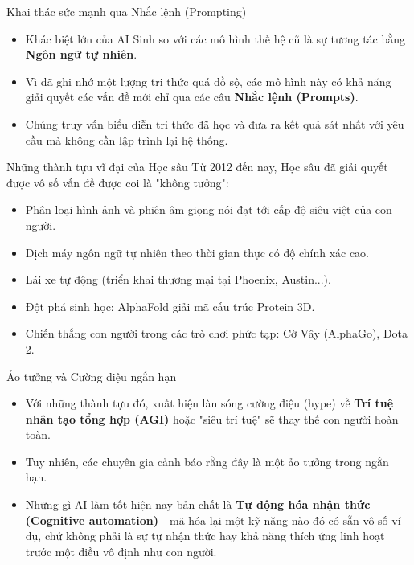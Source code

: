 \documentclass[aspectratio=169]{beamer}
\begin{document}
\begin{frame}{Khai thác sức mạnh qua Nhắc lệnh (Prompting)}
    \begin{itemize}
        \item Khác biệt lớn của AI Sinh so với các mô hình thế hệ cũ là sự tương tác bằng \textbf{Ngôn ngữ tự nhiên}.
        \item Vì đã ghi nhớ một lượng tri thức quá đồ sộ, các mô hình này có khả năng giải quyết các vấn đề mới chỉ qua các câu \textbf{Nhắc lệnh (Prompts)}.
        \item Chúng truy vấn biểu diễn tri thức đã học và đưa ra kết quả sát nhất với yêu cầu mà không cần lập trình lại hệ thống.
    \end{itemize}
\end{frame}

\begin{frame}{Những thành tựu vĩ đại của Học sâu}
    Từ 2012 đến nay, Học sâu đã giải quyết được vô số vấn đề được coi là "không tưởng":
    \begin{itemize}
        \item Phân loại hình ảnh và phiên âm giọng nói đạt tới cấp độ siêu việt của con người.
        \item Dịch máy ngôn ngữ tự nhiên theo thời gian thực có độ chính xác cao.
        \item Lái xe tự động (triển khai thương mại tại Phoenix, Austin...).
        \item Đột phá sinh học: AlphaFold giải mã cấu trúc Protein 3D.
        \item Chiến thắng con người trong các trò chơi phức tạp: Cờ Vây (AlphaGo), Dota 2.
    \end{itemize}
\end{frame}

\begin{frame}{Ảo tưởng và Cường điệu ngắn hạn}
    \begin{itemize}
        \item Với những thành tựu đó, xuất hiện làn sóng cường điệu (hype) về \textbf{Trí tuệ nhân tạo tổng hợp (AGI)} hoặc "siêu trí tuệ" sẽ thay thế con người hoàn toàn.
        \item Tuy nhiên, các chuyên gia cảnh báo rằng đây là một ảo tưởng trong ngắn hạn.
        \item Những gì AI làm tốt hiện nay bản chất là \textbf{Tự động hóa nhận thức (Cognitive automation)} - mã hóa lại một kỹ năng nào đó có sẵn vô số ví dụ, chứ không phải là sự tự nhận thức hay khả năng thích ứng linh hoạt trước một điều vô định như con người.
    \end{itemize}
\end{frame}
\end{document}
